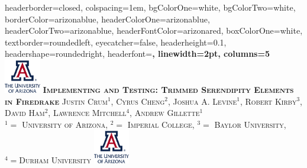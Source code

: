 \documentclass[landscape,a0paper,fontscale=0.285]{baposter} %
\begin{document}
\begin{poster}
{
headerborder=closed, %
colspacing=1em, %
bgColorOne=white, %
bgColorTwo=white, %
borderColor=arizonablue, %
headerColorOne=arizonablue, %
headerColorTwo=arizonablue, %
headerFontColor=arizonared, %
boxColorOne=white, %
textborder=roundedleft, %
eyecatcher=false, %
headerheight=0.1\textheight, %
headershape=roundedright, %
headerfont=\Large\bf\textsc, %
linewidth=2pt, %
columns=5
}
%
{\includegraphics[height=4em]{ua_stack_rgb_4.pdf}} %
{\huge{\bf\textsc{Implementing and Testing:  Trimmed Serendipity Elements in Firedrake}\vspace{0.5em}}} %
{\textsc{Justin Crum$^1$, Cyrus Cheng$^2$, Joshua A. Levine$^1$, Robert Kirby$^3$, David Ham$^2$, Lawrence Mitchell$^4$, Andrew Gillette$^1$\\
$^1=$ University of Arizona, $^2=$ Imperial College, $^3=$ Baylor University, $^4=$Durham University }} %
{\includegraphics[height=4em]{ua_stack_rgb_4.pdf}} %


\end{poster}
\end{document}
